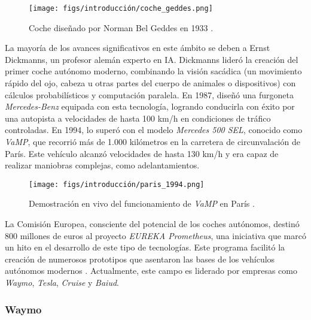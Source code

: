 \begin{figure} [ht]
\begin{center}
\texttt{[image: figs/introducción/coche\_geddes.png]}
\end{center}
\caption{Coche diseñado por Norman Bel Geddes en 1933 \cite{bel-geddes}.}
\label{coche-geddes}
\end{figure}

La mayoría de los avances significativos en este ámbito se deben a Ernst Dickmanns, un profesor alemán experto en \ac{IA}. Dickmanns lideró la creación del primer coche autónomo moderno, combinando la visión sacádica (un movimiento
rápido del ojo, cabeza u otras partes del cuerpo de animales o dispositivos) con cálculos probabilísticos y computación paralela. En 1987, diseñó una furgoneta \textit{Mercedes-Benz} equipada con esta tecnología, logrando conducirla con éxito por una autopista a velocidades de hasta 100 km/h en condiciones de tráfico controladas. En 1994, lo superó con el modelo \textit{Mercedes 500 SEL}, conocido como \textit{VaMP}, que recorrió más de 1.000 kilómetros en la carretera de circunvalación de París. Este vehículo alcanzó velocidades de hasta 130 km/h y era capaz de realizar maniobras complejas, como adelantamientos.

\begin{figure}[ht]
\begin{center}
\texttt{[image: figs/introducción/paris\_1994.png]}
\end{center}
\caption{Demostración en vivo del funcionamiento de \textit{VaMP} en París \cite{dickmanns}.}
\label{coche-geddes}
\end{figure}

La Comisión Europea, consciente del potencial de los coches autónomos, destinó 800 millones de euros al proyecto \textit{EUREKA Prometheus}, una iniciativa que marcó un hito en el desarrollo de este tipo de tecnologías. Este programa facilitó la creación de numerosos prototipos que asentaron las bases de los vehículos autónomos modernos \cite{history-vehicles}. Actualmente, este campo es liderado por empresas como \textit{Waymo}, \textit{Tesla}, \textit{Cruise} y \textit{Baiud}.

\subsubsection{Waymo}

